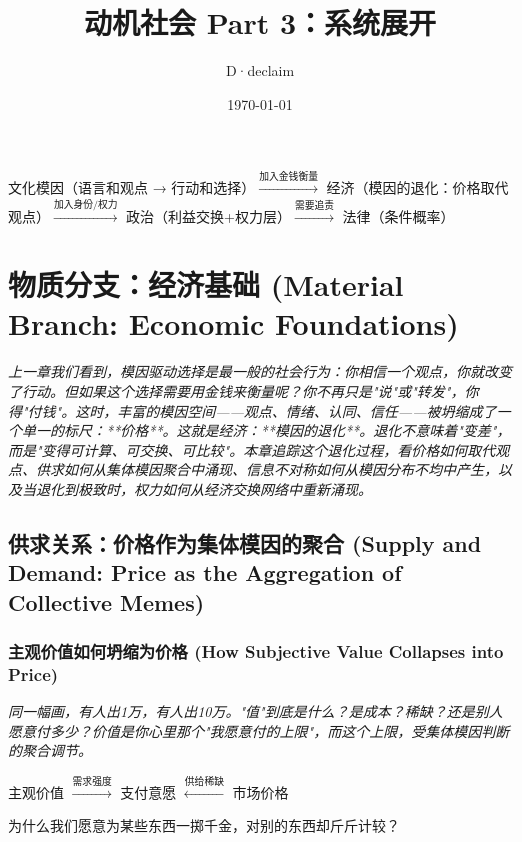 \documentclass[a4paper,12pt]{book}
\title{动机社会 Part 3：系统展开}
\author{D·declaim}
\date{\today}
\newenvironment{motivation}{\begin{tcolorbox}[colback=gray!10,colframe=gray!60,title=\textit{动机}]\small\itshape}{\end{tcolorbox}}
\newenvironment{logicmap}{\begin{tcolorbox}[colback=blue!5,colframe=blue!50,title=\textbf{逻辑地图}]\centering}{\end{tcolorbox}}
\newenvironment{questionbox}{\begin{tcolorbox}[colback=red!3,colframe=red!60]}{\end{tcolorbox}}
\begin{document}
\maketitle
\tableofcontents



	\begin{logicmap}
		文化模因（语言和观点 → 行动和选择）$\xrightarrow{\text{加入金钱衡量}}$ 经济（模因的退化：价格取代观点）$\xrightarrow{\text{加入身份/权力}}$ 政治（利益交换+权力层）$\xrightarrow{\text{需要追责}}$ 法律（条件概率）
	\end{logicmap}

	\chapter{物质分支：经济基础 (Material Branch: Economic Foundations)}
	\begin{motivation}
		上一章我们看到，模因驱动选择是最一般的社会行为：你相信一个观点，你就改变了行动。但如果这个选择需要用金钱来衡量呢？你不再只是"说"或"转发"，你得"付钱"。这时，丰富的模因空间——观点、情绪、认同、信任——被坍缩成了一个单一的标尺：**价格**。这就是经济：**模因的退化**。退化不意味着"变差"，而是"变得可计算、可交换、可比较"。本章追踪这个退化过程，看价格如何取代观点、供求如何从集体模因聚合中涌现、信息不对称如何从模因分布不均中产生，以及当退化到极致时，权力如何从经济交换网络中重新涌现。
	\end{motivation}

	\section{供求关系：价格作为集体模因的聚合 (Supply and Demand: Price as the Aggregation of Collective Memes)}

	\subsection{主观价值如何坍缩为价格 (How Subjective Value Collapses into Price)}
	\begin{motivation}
		同一幅画，有人出1万，有人出10万。"值"到底是什么？是成本？稀缺？还是别人愿意付多少？价值是你心里那个"我愿意付的上限"，而这个上限，受集体模因判断的聚合调节。
	\end{motivation}
	\begin{logicmap}
		主观价值 $\xrightarrow{\text{需求强度}}$ 支付意愿 $\xleftarrow{\text{供给稀缺}}$ 市场价格
	\end{logicmap}
	\begin{questionbox}
		为什么我们愿意为某些东西一掷千金，对别的东西却斤斤计较？
	\end{questionbox}
\end{document}
